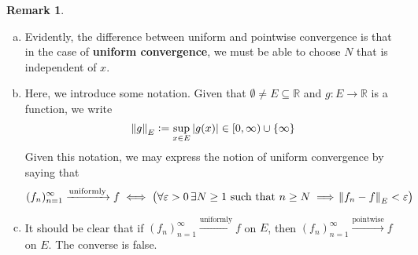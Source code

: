 \documentclass[11pt]{article}
\theoremstyle{definition}
\newtheorem{remark}[thm]{Remark}
\newcommand{\mbR}{\ensuremath{\mathbb{R}}}
\begin{document}
\begin{remark}~
\begin{enumerate}[(a)]  \vspace{-0.2cm}
\item Evidently, the difference between uniform and pointwise convergence is that in the case of \textbf{uniform convergence}, we must be able to choose $N$ that is independent of $x$.
\item Here, we introduce some notation. Given that $\emptyset \ne E \subseteq \mbR$ and $g : E \to \mbR$ is a function, we write
$$\norm{g}_E := \sup_{x \in E} |g(x)| \in [0, \infty) \cup \{\infty\}$$
Given this notation, we may express the notion of uniform convergence by saying that
$$(f_n)_{n=1}^\infty \xrightarrow{\text{uniformly}} f \iff \left(\forall \varepsilon > 0 \, \exists N \geq 1 \text{ such that } n \geq N \implies \norm{f_n - f}_E < \varepsilon\right)$$
\item It should be clear that if $(f_n)_{n=1}^\infty \xrightarrow{\text{uniformly}} f$ on $E$, then $(f_n)_{n=1}^\infty \xrightarrow{\text{pointwise}} f$ on $E$. The converse is false.
\end{enumerate}
\end{remark}
\end{document}
